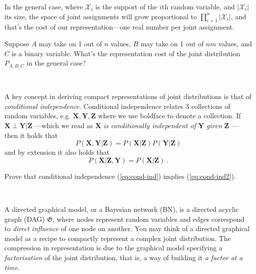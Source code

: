 
In the general case, where $\mathcal X_i$ is the support of the $i$th random variable, and $|\mathcal X_i|$ its size, the space of joint assignments will grow proportional to $\prod_{i=1}^n |\mathcal X_i|$, and that's the cost of our representation---one real number per joint assignment.

\begin{Exercise}[label=ABC]
Suppose $A$ may take on 1 out of $n$ values, $B$ may take on 1 out of $nm$ values, and $C$ is a binary variable. What's the representation cost of the joint distribution $P_{A,B,C}$ in the general case?
\end{Exercise}

~

A key concept in deriving compact representations of joint distributions is that of \emph{conditional independence}. 
Conditional independence relates 3 collections of random variables, e.g. $\mathbf X, \mathbf Y, \mathbf Z$ where we use boldface to denote a collection. If $\mathbf X \perp \mathbf Y | \mathbf Z$ ---which we read as $\mathbf X$ \emph{is conditionally independent of} $\mathbf Y$ \emph{given} $\mathbf Z$ --- then it holds that
\begin{equation}\label{eq:cond-ind}
P(\mathbf X, \mathbf Y| \mathbf Z) = P(\mathbf X|\mathbf Z) P(\mathbf Y| \mathbf Z)
\end{equation}
and by extension it also holds that
\begin{equation}\label{eq:cond-ind2}
P(\mathbf X| \mathbf Z, \mathbf Y) = P(\mathbf X|\mathbf Z)  ~ .
\end{equation}


\begin{Exercise}[label=cond-ind]
Prove that conditional independence (\ref{eq:cond-ind}) implies (\ref{eq:cond-ind2}).
\end{Exercise}

~

A directed graphical model, or a Bayesian network (BN), is a directed acyclic graph (DAG) $\mathfrak G$, where nodes represent random variables and  edges correspond to \emph{direct influence} of one node on another. 
You may think of a directed graphical model as a recipe to compactly represent a complex joint distribution. The compression in representation is due to the graphical model specifying a \emph{factorisation} of the joint distribution, that is, a way of building it \emph{a factor at a time}.

